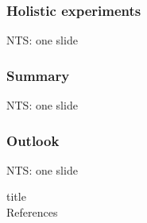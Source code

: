 \documentclass[handout,xcolor={dvipsnames}]{beamer}
\begin{document}
\begin{frame}
\frametitle{Holistic experiments}
NTS: one slide
\end{frame}


\begin{frame}
\frametitle{Summary}
NTS: one slide
\end{frame}

\begin{frame}
\frametitle{Outlook}
NTS: one slide
\end{frame}


\begin{beamercolorbox}{title}
\mbox{}\\[1ex]%
References
\end{beamercolorbox}
\medskip
\scriptsize


\end{document}
